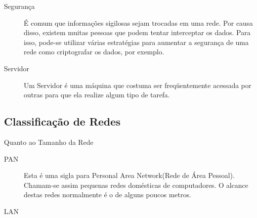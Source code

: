 \begin{description}
		\item[Segurança] É comum que informações sigilosas sejam trocadas em uma rede. Por causa disso, existem muitas pessoas que podem tentar interceptar os dados. Para isso, pode-se utilizar várias estratégias para aumentar a segurança de uma rede como criptografar os dados, por exemplo.
		\item[Servidor] Um Servidor é uma máquina que costuma ser freqüentemente acessada por outras para que ela realize algum tipo de tarefa.
	\end{description}

	\subsection{Classificação de Redes}
	Quanto ao Tamanho da Rede
		\begin{description}
			\item[PAN] Esta é uma sigla para Personal Area Network(Rede de Área Pessoal). Chamam-se assim pequenas redes domésticas de computadores. O alcance destas redes normalmente é o de alguns poucos metros.
			\item[LAN] 
		\end{description}





